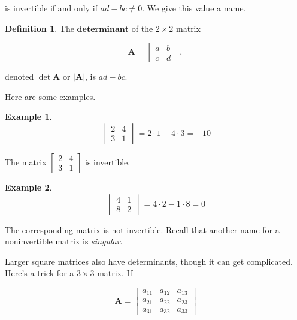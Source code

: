 \documentclass[
]{book}
\theoremstyle{definition}
\newtheorem{definition}{Definition}[chapter]
\theoremstyle{definition}
\newtheorem{example}{Example}[chapter]
\theoremstyle{definition}
\theoremstyle{definition}
\theoremstyle{remark}
\begin{document}
is invertible if and only if \(ad-bc\neq 0\). We give this value a name.

\begin{defbox}

\begin{definition}
The \(\mathbf{determinant}\) of the \(2\times 2\) matrix

\[\mathbf{A}=\begin{bmatrix}
a & b\\c& d
\end{bmatrix},\]

denoted \(\det \mathbf{A}\) or \(|\mathbf{A}|\), is \(ad-bc\).
\end{definition}

\end{defbox}

Here are some examples.

\begin{examplebox}

\begin{example}
\[\begin{vmatrix}
2 & 4\\3 & 1
\end{vmatrix}=2\cdot 1-4\cdot 3=-10\]

The matrix \(\begin{bmatrix}2 & 4\\3 & 1
\end{bmatrix}\) is invertible.
\end{example}

\end{examplebox}

\begin{examplebox}

\begin{example}
\[\begin{vmatrix} 
4 & 1\\ 8 & 2
\end{vmatrix}=4\cdot 2-1\cdot 8=0\]

The corresponding matrix is not invertible. Recall that another name for a noninvertible matrix is \emph{singular}.
\end{example}

\end{examplebox}

Larger square matrices also have determinants, though it can get complicated. Here's a trick for a \(3\times 3\) matrix. If

\[\mathbf{A}=
\begin{bmatrix}
a_{11}&a_{12}&a_{13}\\a_{21}&a_{22}&a_{23}\\a_{31}&a_{32}&a_{33}
\end{bmatrix}\]
\end{document}
